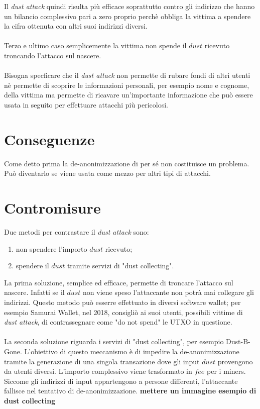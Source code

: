 \FloatBarrier
Il \textit{dust attack} quindi risulta più efficace soprattutto contro gli indirizzo che hanno un bilancio complessivo pari a zero proprio perchè obbliga la vittima a spendere la cifra ottenuta con altri suoi indirizzi diversi.\\\\
Terzo e ultimo caso semplicemente la vittima non spende il $dust$ ricevuto troncando l'attacco sul nascere.\\\\
Bisogna specficare che il \textit{dust attack} non permette di rubare fondi di altri utenti nè permette di scoprire le informazioni personali, per esempio nome e cognome, della vittima ma permette di ricavare un'importante informazione che può essere usata in seguito per effettuare attacchi più pericolosi.

\section{Conseguenze}
Come detto prima la de-anonimizzazione di per sé non costituisce un problema. Può diventarlo se viene usata come mezzo per altri tipi di attacchi. 
\section{Contromisure}
Due metodi per contrastare il \textit{dust attack} sono:
    \begin{enumerate}
        \item non spendere l'importo $dust$ ricevuto; 
        \item spendere il $dust$ tramite servizi di "dust collecting". 
    \end{enumerate}
La prima soluzione, semplice ed efficace, permette di troncare l'attacco sul nascere. Infatti se il $dust$ non viene speso l'attaccante non potrà mai collegare gli indirizzi. 
Questo metodo può esserre effettuato in diversi software wallet; per esempio Samurai Wallet\cite{SamuraiWallet}, nel 2018, consigliò ai suoi utenti, possibili vittime di \textit{dust attack},  di contrassegnare come "do not spend" le UTXO in questione.\\\\
La seconda soluzione riguarda i servizi di "dust collecting", per esempio Dust-B-Gone\cite{Dbg}.
L'obiettivo di questo meccanismo è di impedire la de-anonimizzazione tramite la generazione di una singola transazione dove gli input $dust$ provengono da utenti diversi. L'importo complessivo viene trasformato in $fee$ per i miners. \\Siccome gli indirizzi di input appartengono a persone differenti, l'attaccante fallisce nel tentativo di de-anonimizzazione.
\textbf{mettere un immagine esempio di dust collecting}